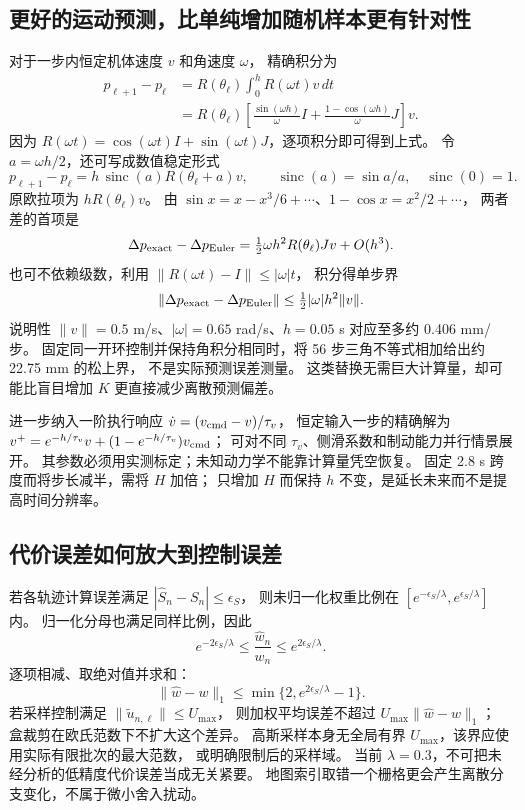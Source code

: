\subsection{更好的运动预测，比单纯增加随机样本更有针对性}
对于一步内恒定机体速度 $v$ 和角速度 $\omega$，
精确积分为
\begin{align}
p_{\ell+1}-p_\ell
&=R(\theta_\ell)\int_0^h R(\omega t)v\,dt\\
&=R(\theta_\ell)
\left[\frac{\sin(\omega h)}{\omega}I+
\frac{1-\cos(\omega h)}{\omega}J\right]v.
\label{eq:se2exact}
\end{align}
因为 $R(\omega t)=\cos(\omega t)I+\sin(\omega t)J$，逐项积分即可得到上式。
令 $a=\omega h/2$，还可写成数值稳定形式
\[
p_{\ell+1}-p_\ell=h\,\operatorname{sinc}(a)R(\theta_\ell+a)v,
\qquad \operatorname{sinc}(a)=\sin a/a,\quad\operatorname{sinc}(0)=1.
\]
原欧拉项为 $hR(\theta_\ell)v$。
由 $\sin x=x-x^3/6+\cdots$、$1-\cos x=x^2/2+\cdots$，
两者差的首项是
\[
\Delta p_{\rm exact}-\Delta p_{\rm Euler}
=\tfrac12\omega h^2R(\theta_\ell)Jv+O(h^3).
\]
也可不依赖级数，利用 $\|R(\omega t)-I\|\le|\omega|t$，
积分得单步界
\[
\|\Delta p_{\rm exact}-\Delta p_{\rm Euler}\|
\le\tfrac12|\omega|h^2\|v\|.
\]
说明性 $\|v\|=0.5$ m/s、$|\omega|=0.65$ rad/s、$h=0.05$ s 对应至多约 0.406 mm/步。
固定同一开环控制并保持角积分相同时，将 56 步三角不等式相加给出约 22.75 mm 的松上界，
不是实际预测误差测量。
这类替换无需巨大计算量，却可能比盲目增加 $K$ 更直接减少离散预测偏差。

进一步纳入一阶执行响应
$\dot v=(v_{\rm cmd}-v)/\tau_v$，
恒定输入一步的精确解为
$v^+=e^{-h/\tau_v}v+(1-e^{-h/\tau_v})v_{\rm cmd}$；
可对不同 $\tau_v$、侧滑系数和制动能力并行情景展开。
其参数必须用实测标定；未知动力学不能靠计算量凭空恢复。
固定 2.8 s 跨度而将步长减半，需将 $H$ 加倍；
只增加 $H$ 而保持 $h$ 不变，是延长未来而不是提高时间分辨率。

\subsection{代价误差如何放大到控制误差}
若各轨迹计算误差满足 $|\widehat S_n-S_n|\le\epsilon_S$，
则未归一化权重比例在 $[e^{-\epsilon_S/\lambda},e^{\epsilon_S/\lambda}]$ 内。
归一化分母也满足同样比例，因此
\[
e^{-2\epsilon_S/\lambda}\le\frac{\widehat w_n}{w_n}
\le e^{2\epsilon_S/\lambda}.
\]
逐项相减、取绝对值并求和：
\begin{equation}
\|\widehat w-w\|_1\le
\min\{2,e^{2\epsilon_S/\lambda}-1\}.
\label{eq:softbound}
\end{equation}
若采样控制满足 $\|\tilde u_{n,\ell}\|\le U_{\max}$，
则加权平均误差不超过 $U_{\max}\|\widehat w-w\|_1$；
盒裁剪在欧氏范数下不扩大这个差异。
高斯采样本身无全局有界 $U_{\max}$，该界应使用实际有限批次的最大范数，
或明确限制后的采样域。
当前 $\lambda=0.3$，不可把未经分析的低精度代价误差当成无关紧要。
地图索引取错一个栅格更会产生离散分支变化，不属于微小舍入扰动。
